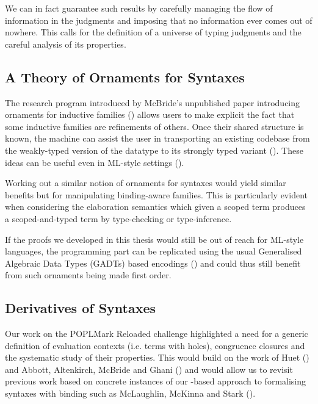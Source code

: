 We can in fact guarantee such results by carefully managing the flow of
information in the judgments and imposing that no information ever comes
out of nowhere. This calls for the definition of a universe of typing
judgments and the careful analysis of its properties.

\subsection{A Theory of Ornaments for Syntaxes}

The research program introduced by McBride's unpublished paper introducing
ornaments for inductive families (\citeyear{mcbride2010ornamental}) allows users
to make explicit the fact that some inductive families are refinements of
others.
Once their shared structure is known, the machine can assist the user in
transporting an existing codebase from the weakly-typed version of the datatype
to its strongly typed variant (\cite{dagand_mcbride_2014}). These ideas can be
useful even in ML-style settings (\cite{Williams:2014:OP:2633628.2633631}).

Working out a similar notion of ornaments for syntaxes would yield similar
benefits but for manipulating binding-aware families. This is particularly
evident when considering the elaboration semantics which given a scoped term
produces a scoped-and-typed term by type-checking or type-inference.

If the proofs we developed in this thesis would still be out of reach for
ML-style languages, the programming part can be replicated using the usual
Generalised Algebraic Data Types (GADTs) based encodings
(\cite{danvytagless,lindley2014hasochism}) and could thus still benefit from
such ornaments being made first order.

\subsection{Derivatives of Syntaxes}

Our work on the POPLMark Reloaded challenge highlighted a need for a generic
definition of evaluation contexts (i.e. terms with holes), congruence closures
and the systematic study of their properties. This would build on the work of
Huet (\citeyear{huet_1997}) and Abbott, Altenkirch, McBride and Ghani
(\citeyear{abbott2005data}) and would allow us to revisit previous work
based on concrete instances of our -based approach to
formalising syntaxes with binding such as McLaughlin, McKinna and
Stark (\citeyear{craig2018triangle}).

